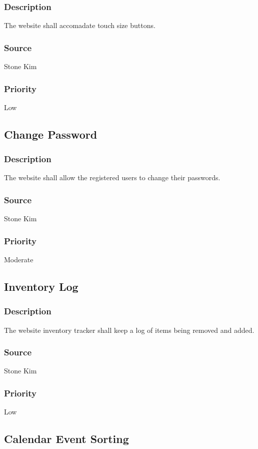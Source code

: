 \subsubsection{Description}
The website shall accomadate touch size buttons.
\subsubsection{Source}
Stone Kim
\subsubsection{Priority}
Low

\subsection{Change Password}
\subsubsection{Description}
The website shall allow the registered users to change their passwords.
\subsubsection{Source}
Stone Kim
\subsubsection{Priority}
Moderate

\subsection{Inventory Log}
\subsubsection{Description}
The website inventory tracker shall keep a log of items being removed and added.
\subsubsection{Source}
Stone Kim
\subsubsection{Priority}
Low

\subsection{Calendar Event Sorting}
